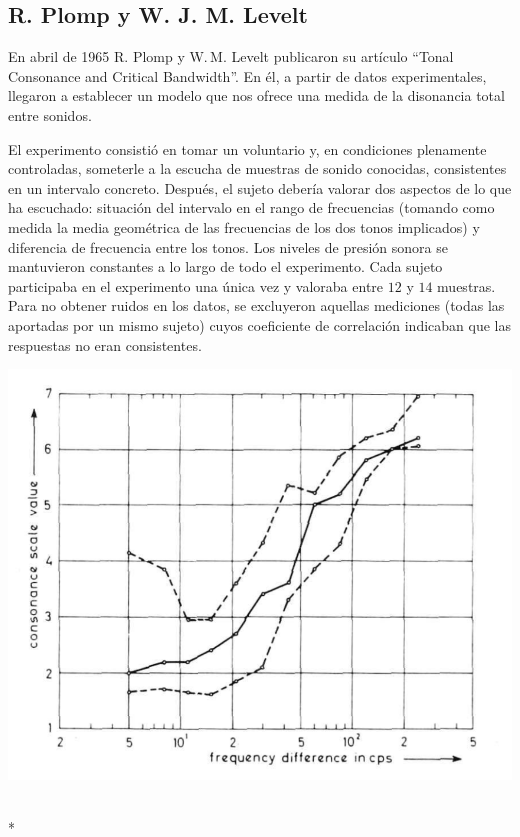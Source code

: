 \documentclass[11pt,a4paper]{article}
\begin{document}
	\subsection{R. Plomp y W. J. M. Levelt}

	En abril de 1965 R. Plomp y W.\,M. Levelt publicaron su artículo ``Tonal Consonance and Critical Bandwidth''\cite{PL}. En él, a partir de datos experimentales, llegaron a establecer un modelo que nos ofrece una medida de la disonancia total entre sonidos.
		
	El experimento consistió en tomar un voluntario y, en condiciones plenamente controladas, someterle a la escucha de muestras de sonido conocidas, consistentes en un intervalo concreto. Después, el sujeto debería valorar dos aspectos de lo que ha escuchado: situación del intervalo en el rango de frecuencias (tomando como medida la media geométrica de las frecuencias de los dos tonos implicados) y diferencia de frecuencia entre los tonos. Los niveles de presión sonora se mantuvieron constantes a lo largo de todo el experimento. Cada sujeto participaba en el experimento una única vez y valoraba entre $12$ y $14$ muestras. Para no obtener ruidos en los datos, se excluyeron aquellas mediciones (todas las aportadas por un mismo sujeto) cuyos coeficiente de correlación indicaban que las respuestas no eran consistentes.
	
	
    \begin{center}\includegraphics[scale=.75]{Datos1.png}\end{center}\\*
    
\end{document}
